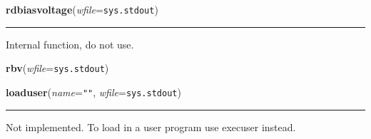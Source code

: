     \label{pydsp:rdbiasvoltage}

    \vspace{0.5ex}

    \begin{boxedminipage}{\textwidth}

    \raggedright \textbf{rdbiasvoltage}(\textit{wfile}=\texttt{sys.stdout})

    \vspace{-1.5ex}

    \rule{\textwidth}{0.5\fboxrule}
    Internal function, do not use.

    \vspace{1ex}

    \end{boxedminipage}

    \label{pydsp:rbv}

    \vspace{0.5ex}

    \begin{boxedminipage}{\textwidth}

    \raggedright \textbf{rbv}(\textit{wfile}=\texttt{sys.stdout})

    \end{boxedminipage}

    \label{pydsp:loaduser}

    \vspace{0.5ex}

    \begin{boxedminipage}{\textwidth}

    \raggedright \textbf{loaduser}(\textit{name}=\texttt{""}, \textit{wfile}=\texttt{sys.stdout})

    \vspace{-1.5ex}

    \rule{\textwidth}{0.5\fboxrule}
    Not implemented. To load in a user program use execuser instead.

    \vspace{1ex}

    \end{boxedminipage}

    \label{pydsp:userload}

    \vspace{0.5ex}

